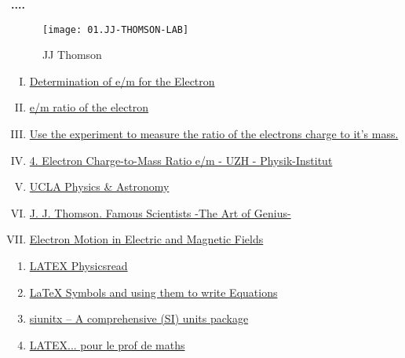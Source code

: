 \documentclass[../main.tex]{subfiles}
\begin{document}
\textbf{....}
        \begin{figure}[bh]
        \centering
        \texttt{[image: 01.JJ-THOMSON-LAB]}
        \label{fig:img1}
        \caption{JJ Thomson}
    \end{figure}
    
\begin{enumerate}[I. ]
    \item \href{https://www.webassign.net/question_assets/unccolphyseml1/lab_4/manual.html}{Determination of e/m for the Electron}
    \item \href{https://physicsx.erau.edu/HelmholtzCoils/Lab_MP_1.pdf}{e/m ratio of the electron}
    \item \href{https://virtuelle-experimente.de/en/b-feld/e-m-bestimmung/edurchm.php}{Use the experiment to measure the ratio of the electrons charge to it's mass.}{}
    \item \href{https://www.physik.uzh.ch/~matthias/espace-assistant/manuals/en/anleitung_etom_e.pdf}{4. Electron Charge-to-Mass Ratio e/m - UZH - Physik-Institut}
    \item \href{https://demoweb.physics.ucla.edu/6b-lab-manual}{UCLA Physics \& Astronomy}
     \item \href{https://www.famousscientists.org/j-j-thomson/}{J. J. Thomson. Famous Scientists -The Art of Genius-}
     \item \href{https://virtuelle-experimente.de/en/index.php}{Electron Motion in Electric and Magnetic Fields}
\end{enumerate}

\begin{enumerate}[1. ]
    \item \href{https://www.physicsread.com/latex-vector-bold/}{LATEX Physicsread}
    \item \href{https://physicsanduniverse.com/latex-symbols-and-using-them-to-write-equations/}{LaTeX Symbols and using them to write Equations}
    \item \href{https://texdoc.org/serve/siunitx/0}{siunitx – A comprehensive (SI) units package}
    \item \href{http://math.univ-lyon1.fr/irem/IMG/pdf/LatexPourLeProfDeMaths.pdf}{LATEX... pour le prof de maths }
\end{enumerate}
\end{document}
